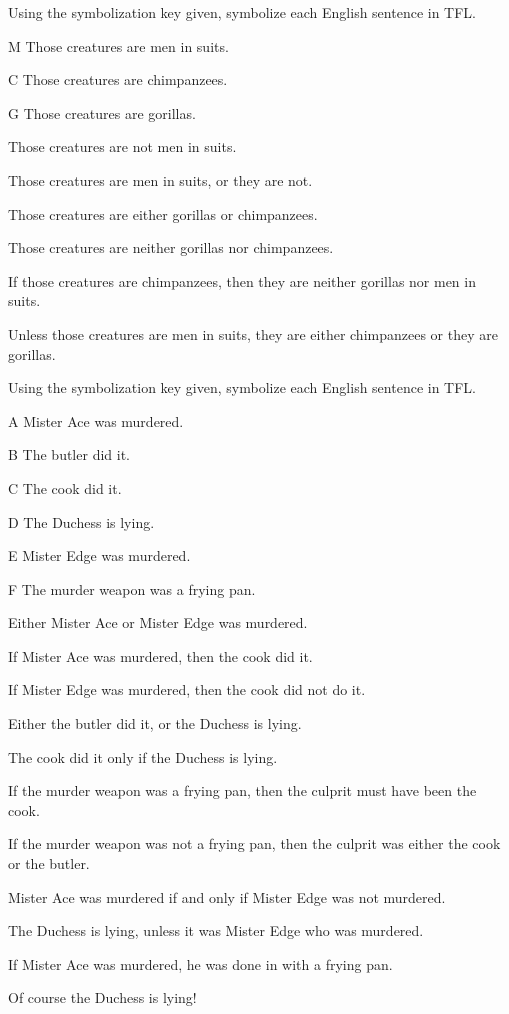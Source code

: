 \practiceproblems
\problempart Using the symbolization key given, symbolize each English sentence in TFL.\label{pr.monkeysuits}
	\begin{ekey}
		\item[M] Those creatures are men in suits. 
		\item[C] Those creatures are chimpanzees. 
		\item[G] Those creatures are gorillas.
	\end{ekey}
\begin{earg}
\item Those creatures are not men in suits.
\item Those creatures are men in suits, or they are not.
\item Those creatures are either gorillas or chimpanzees.
\item Those creatures are neither gorillas nor chimpanzees.
\item If those creatures are chimpanzees, then they are neither gorillas nor men in suits.
\item Unless those creatures are men in suits, they are either chimpanzees or they are gorillas.
\end{earg}

\problempart Using the symbolization key given, symbolize each English sentence in TFL.
\begin{ekey}
\item[A] Mister Ace was murdered.
\item[B] The butler did it.
\item[C] The cook did it.
\item[D] The Duchess is lying.
\item[E] Mister Edge was murdered.
\item[F] The murder weapon was a frying pan.
\end{ekey}
\begin{earg}
\item Either Mister Ace or Mister Edge was murdered.
\item If Mister Ace was murdered, then the cook did it.
\item If Mister Edge was murdered, then the cook did not do it.
\item Either the butler did it, or the Duchess is lying.
\item The cook did it only if the Duchess is lying.
\item If the murder weapon was a frying pan, then the culprit must have been the cook.
\item If the murder weapon was not a frying pan, then the culprit was either the cook or the butler.
\item Mister Ace was murdered if and only if Mister Edge was not murdered.
\item The Duchess is lying, unless it was Mister Edge who was murdered.
\item If Mister Ace was murdered, he was done in with a frying pan.
\item Of course the Duchess is lying!
\end{earg}
\solutions

